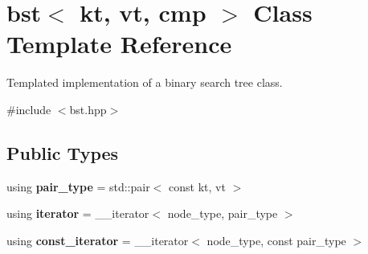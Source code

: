 \hypertarget{classbst}{}\section{bst$<$ kt, vt, cmp $>$ Class Template Reference}
\label{classbst}


Templated implementation of a binary search tree class.  




{\ttfamily \#include $<$bst.\+hpp$>$}

\subsection*{Public Types}
\begin{DoxyCompactItemize}
\item 
\mbox{\label{classbst_a7b11cca2a3b4394915600194f741ab16}} 
using {\bfseries pair\+\_\+type} = std\+::pair$<$ const kt, vt $>$
\item 
\mbox{\label{classbst_a429b0445783ff6486882db5dee900ce0}} 
using {\bfseries iterator} = \+\_\+\+\_\+iterator$<$ node\+\_\+type, pair\+\_\+type $>$
\item 
\mbox{\label{classbst_a72485696d999bf489c6156f6327a2163}} 
using {\bfseries const\+\_\+iterator} = \+\_\+\+\_\+iterator$<$ node\+\_\+type, const pair\+\_\+type $>$
\end{DoxyCompactItemize}
